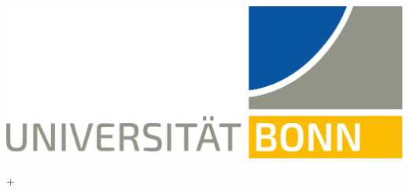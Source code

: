 \begin{titlepage}
\includegraphics[width=6 cm]{logo.png}\\[1cm] %
 

\vfill %

\end{titlepage}
\tableofcontents
\clearpage
\clearpage
\setcounter{page}{1}

+

\printbibliography

